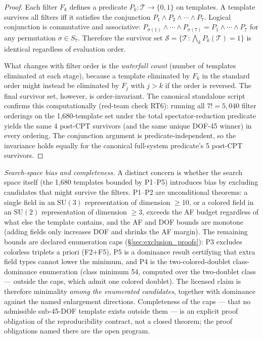 \documentclass[11pt]{article}
\theoremstyle{definition}
\newcommand{\SU}{\mathrm{SU}}
\begin{document}
\begin{proof}
Each filter $F_k$ defines a predicate $P_k: \mathcal{T} \to
\{0, 1\}$ on templates.  A template survives all filters iff it
satisfies the conjunction $P_1 \wedge P_2 \wedge \cdots \wedge P_7$.
Logical conjunction is commutative and associative:
$P_{\sigma(1)} \wedge \cdots \wedge P_{\sigma(7)} = P_1 \wedge
\cdots \wedge P_7$ for any permutation $\sigma \in S_7$.  Therefore
the survivor set $\mathcal{S} = \{\mathcal{T} : \bigwedge_k
P_k(\mathcal{T}) = 1\}$ is identical regardless of evaluation order.

What changes with filter order is the \emph{waterfall count} (number
of templates eliminated at each stage), because a template eliminated
by $F_k$ in the standard order might instead be eliminated by
$F_j$ with $j > k$ if the order is reversed.  The final survivor
set, however, is order-invariant.  The canonical standalone script
confirms this computationally (red-team check RT6): running all
$7! = 5{,}040$ filter orderings on the 1{,}680-template set under the
total spectator-reduction predicate yields the same 4 post-CPT
survivors (and the same unique DOF-45 winner) in every ordering.  The conjunction argument is
predicate-independent, so the invariance holds equally for the
canonical full-system predicate's 5 post-CPT survivors.
\end{proof}

\smallskip\noindent\textit{Search-space bias and completeness.}\quad
A distinct concern is whether the search space itself (the 1{,}680
templates bounded by P1--P5) introduces bias by excluding candidates
that might survive the filters.  P1--P2 are unconditional theorems: a
single field in an $\SU(3)$ representation of dimension $\ge 10$, or a
colored field in an $\SU(2)$ representation of dimension $\ge 3$,
exceeds the AF budget regardless of what else the template contains,
and the AF and DOF bounds are monotone (adding fields only increases
DOF and shrinks the AF margin).  The remaining bounds are declared
enumeration caps (\S\ref{sec:exclusion_proofs}): P3 excludes
colorless triplets a priori (F2$+$F5), P5 is a dominance result
certifying that extra field types cannot lower the minimum, and P4 is the
two-colored-doublet class-dominance enumeration (class minimum 54,
computed over the two-doublet class --- outside the caps, which admit
one colored doublet).  The licensed claim is
therefore minimality \emph{among the enumerated candidates}, together
with dominance against the named enlargement directions.  Completeness
of the caps --- that no admissible sub-45-DOF template exists outside
them --- is an explicit proof obligation of the reproducibility
contract, not a closed theorem; the proof obligations named there are
the open program.
\end{document}
